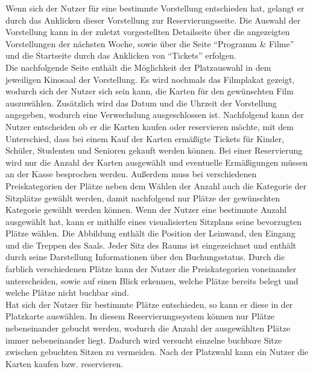 	Wenn sich der Nutzer für eine bestimmte Vorstellung entschieden hat, gelangt er durch das Anklicken dieser Vorstellung zur Reservierungsseite. Die Auswahl der Vorstellung kann in der zuletzt vorgestellten Detailseite über die angezeigten Vorstellungen der nächsten Woche, sowie über die Seite \enquote{Programm \& Filme} und die Startseite durch das Anklicken von \enquote{Tickets} erfolgen. 
	\\Die nachfolgende Seite enthält die Möglichkeit der Platzauswahl in dem jeweiligen Kinosaal der Vorstellung. Es wird nochmals das Filmplakat gezeigt, wodurch sich der Nutzer sich sein kann, die Karten für den gewünschten Film auszuwählen. Zusätzlich wird das Datum und die Uhrzeit der Vorstellung angegeben, wodurch eine Verwechslung ausgeschlossen ist.
	Nachfolgend kann der Nutzer entscheiden ob er die Karten kaufen oder reservieren möchte, mit dem Unterschied, dass bei einem Kauf der Karten ermäßigte Tickets für Kinder, Schüler, Studenten und Senioren gekauft werden können. Bei einer Reservierung wird nur die Anzahl der Karten ausgewählt und eventuelle Ermäßigungen müssen an der Kasse besprochen werden. Außerdem muss bei verschiedenen Preiskategorien der Plätze neben dem Wählen der Anzahl auch die Kategorie der Sitzplätze gewählt werden, damit nachfolgend nur Plätze der gewünschten Kategorie gewählt werden können. 
	Wenn der Nutzer eine bestimmte Anzahl ausgewählt hat, kann er mithilfe eines visualisierten Sitzplans seine bevorzugten Plätze wählen. Die Abbildung enthält die Position der Leinwand, den Eingang und die Treppen des Saals. Jeder Sitz des Raums ist eingezeichnet und enthält durch seine Darstellung Informationen über den Buchungsstatus. Durch die farblich verschiedenen Plätze kann der Nutzer die Preiskategorien voneinander unterscheiden, sowie auf einen Blick erkennen, welche Plätze bereits belegt und welche Plätze nicht buchbar sind. 
	\\Hat sich der Nutzer für bestimmte Plätze entschieden, so kann er diese in der Platzkarte auswählen. In diesem Reservierungssystem können nur Plätze nebeneinander gebucht werden, wodurch die Anzahl der ausgewählten Plätze immer nebeneinander liegt. Dadurch wird versucht einzelne buchbare Sitze zwischen gebuchten Sitzen zu vermeiden. Nach der Platzwahl kann ein Nutzer die Karten kaufen bzw. reservieren. 
	
